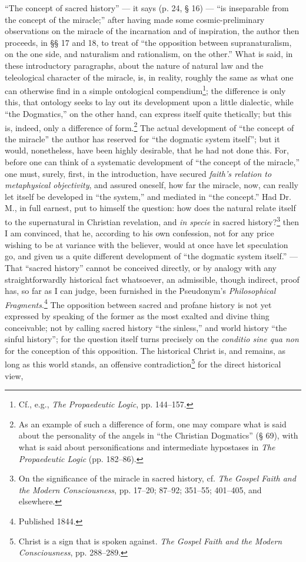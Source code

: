 \documentclass[12pt]{book}
\begin{document}
``The concept of sacred history'' --- it says
(p. 24, § 16) --- ``is inseparable from the concept of the miracle;'' after having made some cosmic-preliminary observations on the miracle of the incarnation and of inspiration, the author then proceeds, in §§ 17 and 18, to treat of ``the opposition between supranaturalism, on the one side, and naturalism and rationalism, on the other.'' What is said, in these introductory paragraphs, about the nature of natural law and the teleological character of the miracle, is, in reality, roughly the same as what one can otherwise find in a simple ontological compendium\footnote{Cf., e.g., \textit{The Propaedeutic Logic}, pp. 144--157.}; the difference is only this, that ontology seeks to lay out its development upon a little dialectic, while ``the Dogmatics,'' on the other hand, can express itself quite thetically; but this is, indeed, only a difference of form.\footnote{As an example of such a difference of form, one may compare what is said about the personality of the angels in ``the Christian Dogmatics'' (§ 69), with what is said about personifications and intermediate hypostases in \textit{The Propaedeutic Logic} (pp. 182--86).} The actual development of ``the concept of the miracle'' the author has reserved for ``the dogmatic system itself''; but it would, nonetheless, have been highly desirable, that he had not done this. For, before one can think of a systematic development of ``the concept of the miracle,'' one must, surely, first, in the introduction, have secured \emph{faith's relation to metaphysical objectivity}, and assured oneself, how far the miracle, now, can really let itself be developed in ``the system,'' and mediated in ``the concept.'' Had Dr. M., in full earnest,
put to himself the question: how does the natural relate itself to the supernatural in Christian revelation, and \textit{in specie} in sacred history?\footnote{On the significance of the miracle in sacred history, cf. \textit{The Gospel Faith and the Modern Consciousness}, pp. 17--20; 87--92; 351--55; 401--405, and elsewhere.} then I am convinced, that he, according to his own confession, not for any price wishing to be at variance with the believer, would at once have let speculation go, and given us a quite different development of ``the dogmatic system itself.'' --- That ``sacred history'' cannot be conceived directly, or by analogy with any straightforwardly historical fact whatsoever, an admissible, though indirect, proof has, so far as I can judge, been furnished in the Pseudonym's \textit{Philosophical Fragments}.\footnote{Published 1844.} The opposition between sacred and profane history is not yet expressed by speaking of the former as the most exalted and divine thing conceivable; not by calling sacred history ``the sinless,'' and world history ``the sinful history''; for the question itself turns precisely on the \textit{conditio sine qua non} for the conception of this opposition. The historical Christ is, and remains, as long as this world stands, an offensive contradiction\footnote{Christ is a sign that is spoken against. \textit{The Gospel Faith and the Modern Consciousness}, pp. 288--289.} for the direct historical view,
\end{document}

